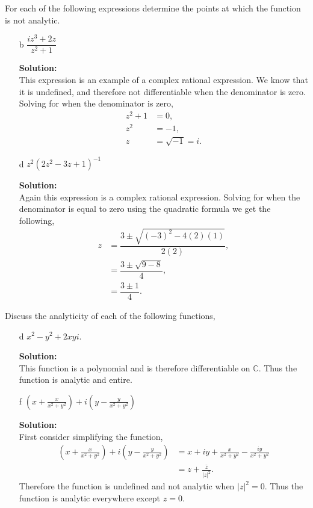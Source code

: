 \documentclass[12pt]{article}
\makeatletter
\theoremstyle{homework}
\newenvironment{exercise}[1]
{\def\@currentlabel{#1}\exercisecore}
{\endexercisecore}
\newcommand{\localhead}[1]{\par\smallskip\noindent\textbf{#1}\nobreak\\}%
\newcommand\solution{\localhead{Solution:}}
\makeatother
\begin{document}
  \begin{exercise}{9} For each of the following expressions determine the points at which the function is not analytic.\\
    \begin{enumerate}
      \item[b] $\dfrac{iz^3 + 2z}{z^2 + 1}$\\
      \solution This expression is an example of a complex rational expression. We know that it is undefined, and therefore 
      not differentiable when the denominator is zero. Solving for when the denominator is zero, 
      \begin{align*}
        z^2 + 1 &= 0,\\
        z^2 &= -1,\\ 
        z  &=  \sqrt{-1} = i. 
      \end{align*}
      \vspace{.15in}


      \item[d] $z^2(2z^2 - 3z + 1)^{-1}$\\
      \solution Again this expression is a complex rational expression. Solving for when the denominator is equal to zero using the quadratic formula we get the 
      following, 
      \begin{align*}
        z &= \dfrac{3 \pm \sqrt{(-3)^2 - 4(2)(1)}}{2(2)},\\
         &= \dfrac{3 \pm \sqrt{9 - 8}}{4},\\
         &= \dfrac{3 \pm 1 }{4}.
      \end{align*}
    \end{enumerate}
  \end{exercise}
  \vspace{.5in}



  \begin{exercise}{11} Discuss the analyticity of each of the following functions, 
    \begin{enumerate}
      \item[d] $x^2 - y^2 + 2xyi$. \\
      \solution This function is a polynomial and is therefore differentiable on $\mathbb{C}$. 
      Thus the function is analytic and entire.  
      \vspace{.15in} 



      \item[f] $(x + \frac{x}{x^2 + y^2}) + i(y - \frac{y}{x^2 + y^2})$\\
      \solution First consider simplifying the function, 
      \begin{align*}
        (x + \frac{x}{x^2 + y^2}) + i(y - \frac{y}{x^2 + y^2}) &= x + iy + \frac{x}{x^2 + y^2}- \frac{iy}{x^2 + y^2}\\
        &= z + \frac{\bar{z}}{|z|^2}.
      \end{align*}
      Therefore the function is undefined and not analytic when $|z|^2 = 0$. Thus the function is analytic everywhere except 
      $z = 0$.
    \end{enumerate}
  \end{exercise}
  \vspace{.15in}
\end{document}
